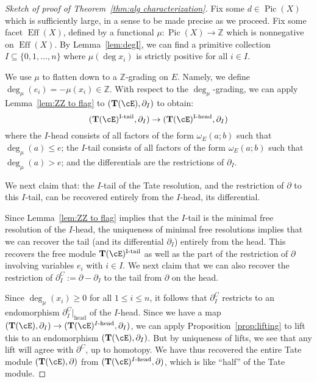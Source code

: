 \documentclass[12pt]{amsart}
\theoremstyle{definition}
\theoremstyle{remark}
\newcommand{\Tate}{{\mathbf{T}}}
\newcommand{\ZZ}{\mathbb Z}
\newcommand{\Eff}{\operatorname{Eff}}
\newcommand{\Pic}{\operatorname{Pic}}
\begin{document}
\begin{proof}[Sketch of proof of Theorem~\ref{thm:alg characterization}]
Fix some $d\in \Pic(X)$ which is sufficiently large, in a sense to be made precise as we proceed.  Fix some facet $\Eff(X)$, defined by a functional $\mu:\Pic(X)\to \ZZ$ which is nonnegative on $\Eff(X)$.  By Lemma~\ref{lem:degI}, we can find a primitive collection $I\subseteq \{0,1,\dots,n\}$ where  $\mu(\deg x_i)$ is strictly positive for all $i\in I$.  

We use $\mu$ to flatten down to a $\ZZ$-grading on $E$.  Namely, we define $\deg_{\mu}(e_i) = -\mu(x_i)\in \ZZ$.  With respect to the $\deg_{\mu}$-grading,  we can apply Lemma~\ref{lem:ZZ to flag} to $(\Tate(\cE),\partial_I)$ to obtain:
\[
(\Tate(\cE)^{\text{I-tail}},\partial_I) \to  (\Tate(\cE)^{\text{I-head}},\partial_I)
\]
where the $I$-head consists of all factors of the form $\omega_E(a;b)$ such that $\deg_{\mu}(a) \leq e$; the $I$-tail consists of all factors of the form $\omega_E(a;b)$ such that $\deg_{\mu}(a) > e$; and the differentials are the restrictions of $\partial_I$.

We next claim that: the $I$-tail of the Tate resolution, and the restriction of $\partial$ to this $I$-tail, can be recovered entirely from the $I$-head, its differential.

Since Lemma~\ref{lem:ZZ to flag} implies that the $I$-tail is the minimal free resolution of the $I$-head, the uniqueness of minimal free resolutions implies that we can recover the tail (and its differential $\partial_I$) entirely from the head.   This recovers the free module $\Tate(\cE)^{\text{I-tail}}$ as well as the part of the restriction of $\partial$ involving variables $e_i$ with $i\in I$.  We next claim that we can also recover the restriction of $\partial_I^C:=\partial - \partial_I$ to the tail from $\partial$ on the head.

Since $\deg_{\mu}(x_i)\geq 0$ for all $1\leq i \leq n$, it follows that $\partial_I^C$ restricts to an endomorphism $\partial_I^C|_{\text{head}}$  of the $I$-head.  Since we have a map $(\Tate(\cE),\partial_I) \to (\Tate(\cE)^{\text{$I$-head}},\partial_I)$, we can apply Proposition~\ref{prop:lifting} to lift this to an endomorphism $(\Tate(\cE),\partial_I)$.  But by uniqueness of lifts, we see that any lift will agree with $\partial^C$, up to homotopy. We have thus recovered the entire Tate module $(\Tate(\cE),\partial)$ from $(\Tate(\cE)^{\text{$I$-head}},\partial)$, which is like ``half'' of the Tate module.


\end{proof}
\end{document}
